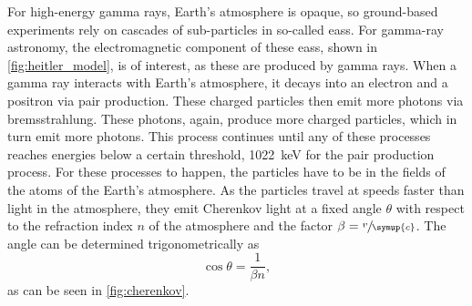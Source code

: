 For high-energy gamma rays, Earth's atmosphere is opaque, so ground-based experiments rely on
cascades of sub-particles in so-called \glspl{eas}. For gamma-ray astronomy, the electromagnetic
component of these \glspl{eas}, shown in \autoref{fig:heitler_model}, is of interest, as these
are produced by gamma rays. When a gamma ray interacts with Earth's atmosphere, it decays into an
electron and a positron via pair production. These charged particles then emit more photons via
bremsstrahlung. These photons, again, produce more charged particles, which in turn emit more
photons. This process continues until any of these processes reaches energies below a certain
threshold, \ie \SI{1022}{\kilo\eV} for the pair production process. For these processes to happen,
the particles have to be in the fields of the atoms of the Earth's atmosphere. As the particles
travel at speeds faster than light in the atmosphere, they emit Cherenkov light at
a fixed angle \(\theta\) with respect to the refraction index \(n\) of the atmosphere and the
factor \(\beta = \sfrac{v}{\symup{c}}\). The angle can be determined trigonometrically as
\begin{equation}
    \cos\theta = \frac{1}{\beta n},
\end{equation}
as can be seen in \autoref{fig:cherenkov}.

